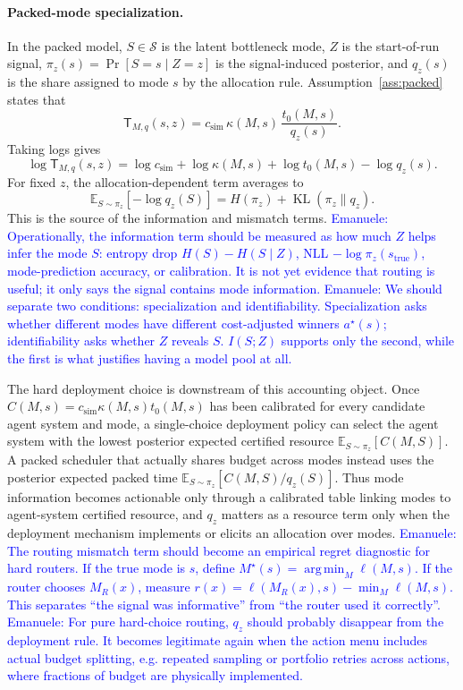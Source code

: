 \documentclass{article}
\DeclareMathOperator*{\argmin}{arg\,min}
\DeclareMathOperator{\KL}{KL}
\newcommand{\cS}{\mathcal{S}}
\newcommand{\E}{\mathbb{E}}
\begin{document}
\paragraph{Packed-mode specialization.}
In the packed model, \(S\in\cS\) is the latent bottleneck mode, \(Z\) is the start-of-run
signal, \(\pi_z(s)=\Pr[S=s\mid Z=z]\) is the signal-induced posterior, and \(q_z(s)\)
is the share assigned to mode \(s\) by the allocation rule.  Assumption~\ref{ass:packed}
states that
\[
    \mathsf T_{M,q}(s,z)
    =
    c_{\mathrm{sim}}\,
    \kappa(M,s)\,
    \frac{t_0(M,s)}{q_z(s)} .
\]
Taking logs gives
\[
    \log \mathsf T_{M,q}(s,z)
    =
    \log c_{\mathrm{sim}}
    +
    \log\kappa(M,s)
    +
    \log t_0(M,s)
    -
    \log q_z(s).
\]
For fixed \(z\), the allocation-dependent term averages to
\[
    \E_{S\sim\pi_z}[-\log q_z(S)]
    =
    H(\pi_z)+\KL(\pi_z\|q_z).
\]
This is the source of the information and mismatch terms.
\textcolor{blue}{Emanuele: Operationally, the information term should be measured as how much \(Z\) helps infer the mode \(S\): entropy drop \(H(S)-H(S\mid Z)\), NLL \(-\log\pi_z(s_{\mathrm{true}})\), mode-prediction accuracy, or calibration. It is not yet evidence that routing is useful; it only says the signal contains mode information.}
\textcolor{blue}{Emanuele: We should separate two conditions: specialization and identifiability. Specialization asks whether different modes have different cost-adjusted winners \(a^\star(s)\); identifiability asks whether \(Z\) reveals \(S\). \(I(S;Z)\) supports only the second, while the first is what justifies having a model pool at all.}

The hard deployment choice is downstream of this accounting object.  Once
\(C(M,s)=c_{\mathrm{sim}}\kappa(M,s)t_0(M,s)\) has been calibrated for every
candidate agent system and mode, a single-choice deployment policy can select the
agent system with the lowest posterior expected certified resource
\(\E_{S\sim\pi_z}[C(M,S)]\).  A packed scheduler that actually shares budget
across modes instead uses the posterior expected packed time
\(\E_{S\sim\pi_z}[C(M,S)/q_z(S)]\).  Thus mode information becomes actionable
only through a calibrated table linking modes to agent-system certified resource,
and \(q_z\) matters as a resource term only when the deployment mechanism
implements or elicits an allocation over modes.
\textcolor{blue}{Emanuele: The routing mismatch term should become an empirical regret diagnostic for hard routers. If the true mode is \(s\), define \(M^\star(s)=\argmin_M\ell(M,s)\). If the router chooses \(M_R(x)\), measure \(r(x)=\ell(M_R(x),s)-\min_M\ell(M,s)\). This separates ``the signal was informative'' from ``the router used it correctly''.}
\textcolor{blue}{Emanuele: For pure hard-choice routing, \(q_z\) should probably disappear from the deployment rule. It becomes legitimate again when the action menu includes actual budget splitting, e.g. repeated sampling or portfolio retries across actions, where fractions of budget are physically implemented.}
\end{document}
